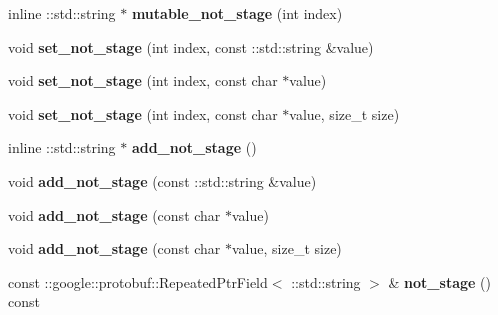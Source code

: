 \begin{DoxyCompactItemize}
\mbox{\label{classcaffe_1_1_net_state_rule_a5edf997e1ba406c0bc05ebd7a7ac83dc}} 
inline \+::std\+::string $\ast$ {\bfseries mutable\+\_\+not\+\_\+stage} (int index)
\item 
\mbox{\label{classcaffe_1_1_net_state_rule_a82ca92331a3f2cc0ea823a0a589a369c}} 
void {\bfseries set\+\_\+not\+\_\+stage} (int index, const \+::std\+::string \&value)
\item 
\mbox{\label{classcaffe_1_1_net_state_rule_aaf58f6e46077be52db99befc73963220}} 
void {\bfseries set\+\_\+not\+\_\+stage} (int index, const char $\ast$value)
\item 
\mbox{\label{classcaffe_1_1_net_state_rule_abf93f86278d842f10b655ade642be444}} 
void {\bfseries set\+\_\+not\+\_\+stage} (int index, const char $\ast$value, size\+\_\+t size)
\item 
\mbox{\label{classcaffe_1_1_net_state_rule_ac4f9908325da0213cd2a22d1f19e4441}} 
inline \+::std\+::string $\ast$ {\bfseries add\+\_\+not\+\_\+stage} ()
\item 
\mbox{\label{classcaffe_1_1_net_state_rule_a8c5d308a4c7426e063d6a7fa3e7c4844}} 
void {\bfseries add\+\_\+not\+\_\+stage} (const \+::std\+::string \&value)
\item 
\mbox{\label{classcaffe_1_1_net_state_rule_a8b5417f55be52a112f2674812d5448af}} 
void {\bfseries add\+\_\+not\+\_\+stage} (const char $\ast$value)
\item 
\mbox{\label{classcaffe_1_1_net_state_rule_a9e4abe1478c0663fa3f5b61bbace6157}} 
void {\bfseries add\+\_\+not\+\_\+stage} (const char $\ast$value, size\+\_\+t size)
\item 
\mbox{\label{classcaffe_1_1_net_state_rule_a52d440757d563fb4d9d498b243fa4959}} 
const \+::google\+::protobuf\+::\+Repeated\+Ptr\+Field$<$ \+::std\+::string $>$ \& {\bfseries not\+\_\+stage} () const
\item 
\mbox{\label{classcaffe_1_1_net_state_rule_aa3c9f359af28b6c1ad1e055aadab1063}} 

\end{DoxyCompactItemize}
